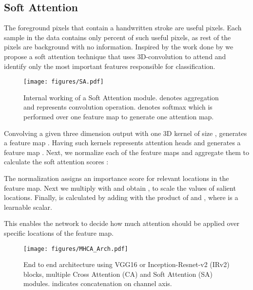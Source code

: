 \documentclass[a4paper,conference]{IEEEtran}
\begin{document}
\subsection{Soft Attention}
The foreground pixels that contain a handwritten stroke are useful pixels. Each sample in the data contains only  percent of such useful pixels, as rest of the pixels are background with no information. Inspired by the work done by \cite{tomita_attention-based_2019} we propose a soft attention technique that uses 3D-convolution \cite{tran_learning_2015} to attend and identify only the most important features responsible for classification. 
\begin{figure}[!htp]
\begin{center}
\texttt{[image: figures/SA.pdf]}
\caption{\label{fig:soft_attention} Internal working of a Soft Attention module.  denotes aggregation and  represents convolution operation.  denotes softmax which is performed over one feature map to generate one attention map.} 
\end{center}
\end{figure}
\newline \indent Convolving a given three dimension output  with one 3D kernel  of size , generates a feature map .
\newline \indent Having  such kernels represents  attention heads and generates a feature map . Next, we normalize each of the  feature maps and aggregate them to calculate the soft attention scores :

The normalization assigns an importance score for relevant locations in the feature map. Next we multiply  with  and obtain , to scale the values of salient locations. Finally,  is calculated by adding  with the product of  and , where  is a learnable scalar.

This enables the network to decide how much attention should be applied over specific locations of the feature map.
\begin{figure}[!htp]
\begin{center}
\texttt{[image: figures/MHCA\_Arch.pdf]}
\caption{\label{fig:architecture} End to end architecture using VGG16\cite{vgg16} or Inception-Resnet-v2 (IRv2) \cite{szegedy_inception-v4_2017} blocks, multiple Cross Attention (CA) and Soft Attention (SA) modules.  indicates concatenation on channel axis.}
\end{center}
\end{figure}
\end{document}

